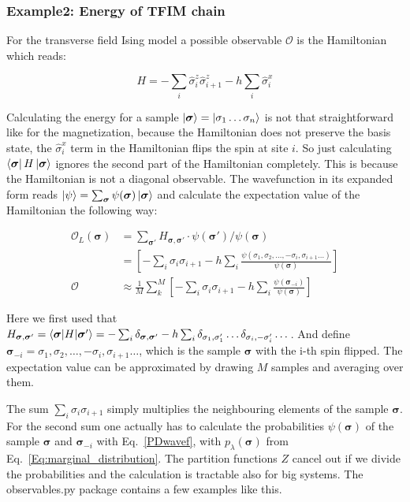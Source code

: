 \documentclass[submission, Phys]{SciPost}
\begin{document}
\subsubsection{Example2: Energy of TFIM chain}

For the transverse field Ising model a possible observable $\mathcal{O}$ is the Hamiltonian which reads:

\begin{equation}
H = -\sum_i \hat{\sigma}^z_i \hat{\sigma}^z_{i+1} - h \sum_i \hat{\sigma}^x_{i}
\end{equation}

Calculating the energy for a sample $\ket{\bm{\sigma} }= \ket{\sigma_1 \dots  \sigma_n}$ is not that straightforward like for the magnetization, because the Hamiltonian does not preserve the basis state, the $\hat{\sigma}^x_i$ term in the Hamiltonian flips the spin at site $i$. So just calculating $\bra{\bm{\sigma} } H \ket{\bm{\sigma} }$ ignores the second part of the Hamiltonian completely. This is because the Hamiltonian is not a diagonal observable. The wavefunction in its expanded form reads $\ket{\psi} = \sum_{\bm{\sigma}} \psi(\bm{\sigma}) \ket{\bm{\sigma}} $ and calculate the expectation value of the Hamiltonian the following way:

\begin{align}
\mathcal{O}_L({\bm{\sigma}}) &= \sum_{ \bm{\sigma'}} H_{\bm{\sigma}, \bm{\sigma}'} \cdot \psi(\bm{\sigma}') / \psi(\bm{\sigma}) \\
&=   \left[ -\sum_i \sigma_i \sigma_{i+1} - h \sum_i \frac{\psi(\sigma_1, \sigma_2, \dots , -\sigma_i, \sigma_{i+1} \dots)}{\psi (\bm{\sigma})} \right]\\
\mathcal{O} &\approx \frac{1}{M} \sum_k^M \left[ -\sum_i \sigma_i \sigma_{i+1} - h \sum_i \frac{\psi (\bm{\sigma}_{-i})}{\psi (\bm{\sigma})} \right]
\end{align}

Here we first used that $H_{\bm{\sigma}, \bm{\sigma}'}  = \braket{\bm{\sigma} | H | \bm{\sigma}'} = -\sum_i \delta_{\bm{\sigma}, \bm{\sigma}'} - h \sum_i \delta_{\sigma_1, \sigma_1'} \dots \delta_{\sigma_i, -\sigma_i'} \dots$. And define $\bm{\sigma}_{-i} = \sigma_1, \sigma_2, \dots , -\sigma_i, \sigma_{i+1} \dots$, which is the sample $\bm{\sigma}$ with the i-th spin flipped.
The expectation value can be approximated by drawing $M$ samples and averaging over them.

The sum $\sum_i \sigma_i \sigma_{i+1}$ simply multiplies the neighbouring elements of the sample $\bm{\sigma}$. For the second sum one actually has to calculate the probabilities $\psi (\bm{\sigma})$ of the sample $\bm{\sigma}$ and $\bm{\sigma}_{-i} $ with
Eq.~\ref{PDwavef},
with $p_{\lambda}(\bm{\sigma})$ from Eq.~\ref{Eq:marginal_distribution}. The partition functions $Z$ cancel out if we divide the probabilities and the calculation is tractable also for big systems.
The observables.py package contains a few examples like this.
\end{document}
